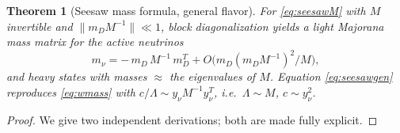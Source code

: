 \documentclass[12pt]{article}
\newtheorem{theorem}{Theorem}
\theoremstyle{definition}
\begin{document}
\begin{theorem}[Seesaw mass formula, general flavor]\label{thm:seesaw}
For \eqref{eq:seesawM} with $M$ invertible and
$\|m_D M^{-1}\|\ll1$, block diagonalization yields a light Majorana mass
matrix for the active neutrinos
\begin{equation}\label{eq:seesawgen}
m_\nu=-\,m_D\,M^{-1}\,m_D^{T}+O\!\big(m_D (m_D M^{-1})^2/M\big),
\end{equation}
and heavy states with masses $\approx$ the eigenvalues of $M$. Equation
\eqref{eq:seesawgen} reproduces \eqref{eq:wmass} with
$c/\Lambda \sim y_\nu M^{-1} y_\nu^T$, i.e.\
$\Lambda\sim M$, $c\sim y_\nu^2$.
\end{theorem}
\begin{proof}
We give two independent derivations; both are made fully explicit.


\end{proof}
\end{document}
